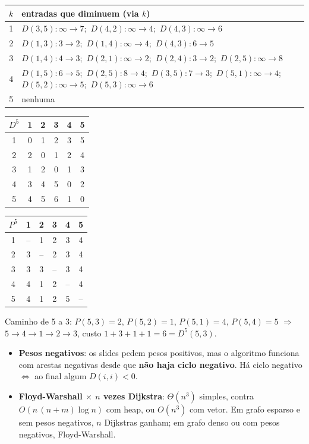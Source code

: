 \begin{exemplo}\leavevmode
\begin{center}\small
\begin{tabular}{c|l}
$k$ & entradas que diminuem (via $k$)\\ \hline
1 & $D(3,5)\!:\infty\to7$;\ $D(4,2)\!:\infty\to4$;\ $D(4,3)\!:\infty\to6$\\
2 & $D(1,3)\!:3\to2$;\ $D(1,4)\!:\infty\to4$;\ $D(4,3)\!:6\to5$\\
3 & $D(1,4)\!:4\to3$;\ $D(2,1)\!:\infty\to2$;\ $D(2,4)\!:3\to2$;\ $D(2,5)\!:\infty\to8$\\
4 & $D(1,5)\!:6\to5$;\ $D(2,5)\!:8\to4$;\ $D(3,5)\!:7\to3$;\ $D(5,1)\!:\infty\to4$;\ $D(5,2)\!:\infty\to5$;\ $D(5,3)\!:\infty\to6$\\
5 & nenhuma
\end{tabular}
\end{center}
\begin{center}\small
\begin{tabular}{c|ccccc}
$D^5$ & 1 & 2 & 3 & 4 & 5\\ \hline
1 & 0 & 1 & 2 & 3 & 5\\
2 & 2 & 0 & 1 & 2 & 4\\
3 & 1 & 2 & 0 & 1 & 3\\
4 & 3 & 4 & 5 & 0 & 2\\
5 & 4 & 5 & 6 & 1 & 0
\end{tabular}
\qquad
\begin{tabular}{c|ccccc}
$P^5$ & 1 & 2 & 3 & 4 & 5\\ \hline
1 & -- & 1 & 2 & 3 & 4\\
2 & 3 & -- & 2 & 3 & 4\\
3 & 3 & 3 & -- & 3 & 4\\
4 & 4 & 1 & 2 & -- & 4\\
5 & 4 & 1 & 2 & 5 & --
\end{tabular}
\end{center}
Caminho de 5 a 3: $P(5,3)=2$, $P(5,2)=1$, $P(5,1)=4$, $P(5,4)=5$ $\Rightarrow$ $5\to4\to1\to2\to3$, custo $1+3+1+1=6=D^5(5,3)$.
\end{exemplo}
\begin{itemize}
  \item \textbf{Pesos negativos}: os slides pedem pesos positivos, mas o algoritmo funciona com arestas negativas desde que \textbf{não haja ciclo negativo}. Há ciclo negativo $\iff$ ao final algum $D(i,i)<0$.
  \item \textbf{Floyd-Warshall $\times$ $n$ vezes Dijkstra}: $\Theta(n^3)$ simples, contra $O(n\,(n+m)\log n)$ com heap, ou $O(n^3)$ com vetor. Em grafo esparso e sem pesos negativos, $n$ Dijkstras ganham; em grafo denso ou com pesos negativos, Floyd-Warshall.
\end{itemize}

